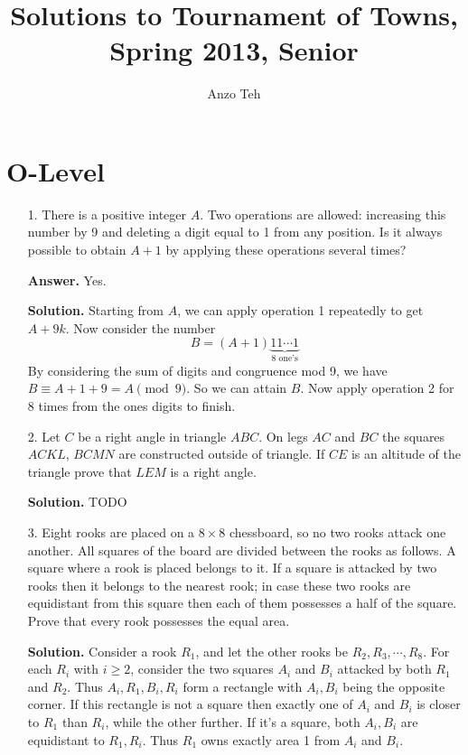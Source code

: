 \documentclass[11pt,a4paper]{article}
\begin{document}
\newcommand{\la}{\leftarrow}
\newcommand{\lra}{\leftrightarrow}
\newcommand{\bbN}{\mathbb{N}}
\newcommand{\bbZ}{\mathbb{Z}}
\newcommand{\dsum}{\displaystyle\sum}
\newcommand{\dprod}{\displaystyle\prod}


\title{Solutions to Tournament of Towns, Spring 2013, Senior}
\author{Anzo Teh}
\date{}
\maketitle

\section*{O-Level}
\begin{enumerate}
	\item[1.] 
	There is a positive integer $A$. Two operations are allowed: increasing this number by
	9 and deleting a digit equal to 1 from any position. Is it always possible to obtain $A + 1$ by
	applying these operations several times?
	
	\textbf{Answer.} Yes. 
	
	\textbf{Solution.} Starting from $A$, we can apply operation 1 repeatedly to get $A+9k$. 
	Now consider the number
	\[
	B=(A+1)\underbrace{11\cdots 1}_{8\text{ one's}}
	\]
    By considering the sum of digits and congruence mod 9, we have $B\equiv A+1+9=A\pmod{9}$. 
    So we can attain $B$. 
    Now  apply operation 2 for 8 times from the ones digits to finish. 
    
    \item [2.] 
    Let $C$ be a right angle in triangle $ABC$. On legs $AC$ and $BC$ the squares $ACKL$,
    $BCMN$ are constructed outside of triangle. If $CE$ is an altitude of the triangle prove that
    $LEM$ is a right angle.
    
    \textbf{Solution.} TODO
    
    \item [3.] 
    Eight rooks are placed on a $8 \times 8$ chessboard, so no two rooks attack one another.
    All squares of the board are divided between the rooks as follows. 
    A square where a rook is placed belongs to it. 
    If a square is attacked by two rooks then it belongs to the nearest rook; 
    in case these two rooks are equidistant from this square then each of them possesses a half of the square. Prove that every rook possesses the equal area.
    
    \textbf{Solution.} 
    Consider a rook $R_1$, and let the other rooks be $R_2, R_3, \cdots, R_8$. 
    For each $R_i$ with $i\ge 2$, consider the two squares $A_i$ and $B_i$ attacked by both $R_1$ and $R_2$. 
    Thus $A_i, R_1, B_i, R_i$ form a rectangle with $A_i, B_i$ being the opposite corner. 
    If  this rectangle is not a square then exactly one of $A_i$ and $B_i$  is closer to $R_1$ than $R_i$, 
    while the other further. 
    If it's a square, both $A_i, B_i$ are equidistant to $R_1, R_i$. 
    Thus $R_1$ owns exactly area 1 from $A_i$ and $B_i$. 
    

\end{enumerate}
\end{document}
